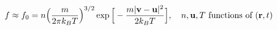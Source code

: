 \documentclass[preview]{standalone}
\begin{document}
\begin{align*}
\special{dvisvgm:raw <g id='unique000'>}f\approx f_0=n\Big(\frac{m}{2\pi k_BT}\Big)^{3/2}\exp\Big[-\frac{m|\va v-\va u|^2}{2k_BT}\Big] \special{dvisvgm:raw </g>}\special{dvisvgm:raw <g id='unique001'>},\quad n,\va u,T\ \text{functions of}\ (\va r,t)\special{dvisvgm:raw </g>}
\end{align*}
\end{document}

